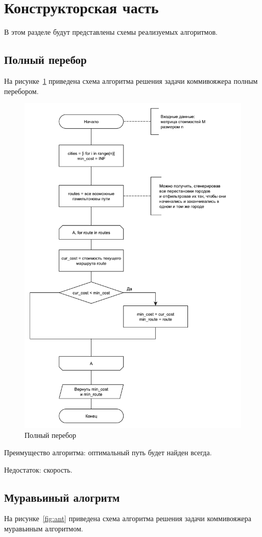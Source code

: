 \section{Конструкторская часть}

В этом разделе будут представлены схемы реализуемых алгоритмов.

\subsection{Полный перебор}

На рисунке~\ref{fig:bruteforce} приведена схема алгоритма решения задачи коммивояжера полным перебором. 

\begin{figure}
	\centering
	\includegraphics[width=0.65\linewidth]{images/bruteforce}
	\caption{Полный перебор}
	\label{fig:bruteforce}
\end{figure}

Преимущество алгоритма: оптимальный путь будет найден всегда.

Недостаток: скорость.

\subsection{Муравьиный алогритм}

На рисунке~\ref{fig:ant} приведена схема алгоритма решения задачи коммивояжера муравьиным алгоритмом. 


